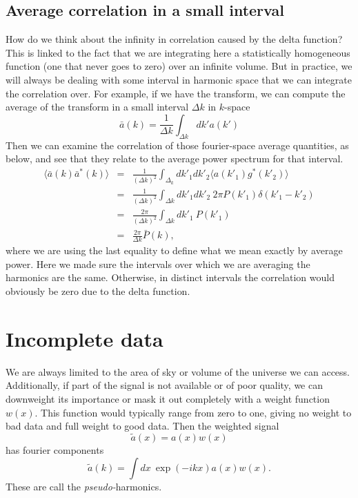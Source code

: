 \subsection{Average correlation in a small interval}
How do we think about the infinity in correlation caused by the delta function?  This is linked to the fact that we are integrating here a statistically homogeneous function (one that never goes to zero) over an infinite volume.  But in practice, we will always be dealing with some interval in harmonic space that we can integrate the correlation over.  For example, if we have the transform, we can compute the average of the transform in a small interval $\Delta k$ in $k$-space
\begin{equation}
  \bar a(k) = \frac{1}{\Delta k} \int_{\Delta k} dk' a(k')
\end{equation}
Then we can examine the correlation of those fourier-space average quantities, as below, and see that they relate to the average power spectrum for that interval. 
\begin{eqnarray}
  \langle \bar a(k)  \bar a^*(k) \rangle &=& \frac{1}{(\Delta k)^2} \int_{\Delta_k} dk'_1 dk'_2 \langle a(k'_1) g^*(k'_2) \rangle \\
  &=& \frac{1}{(\Delta k)^2} \int_{\Delta k} dk'_1 dk'_2 \ 2\pi P(k'_1) \delta(k'_1 - k'_2) \\
  &=& \frac{2\pi}{(\Delta k)^2}  \int_{\Delta k} dk'_1 \  P(k'_1) \\
  &=& \frac{2\pi}{\Delta k}  \bar P(k),
\end{eqnarray}
where we are using the last equality to define what we mean exactly by average power.  Here we made sure the intervals over which we are averaging the harmonics are the same.  Otherwise, in distinct intervals the correlation would obviously be zero due to the delta function.


\section{Incomplete data}

We are always limited to the area of sky or volume of the universe we can access.  Additionally, if part of the signal is not available or of poor quality, we can downweight its importance or mask it out completely with a weight function $w(x)$.  This function would typically range from zero to one, giving no weight to bad data and full weight to good data.  Then the weighted signal
\begin{equation}\tilde a(x) = a(x) w(x)\end{equation}
has fourier components
\begin{equation}
  \tilde a(k) = \int dx\  \exp(-i k x) a(x) w(x).
\end{equation}
These are call the \textit{pseudo-}harmonics.

